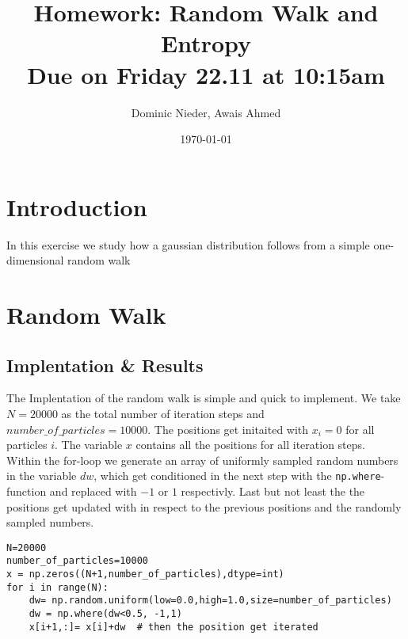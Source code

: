 \documentclass{article}[a4paper]
\title{
    \vspace{2in}
    \textmd{\textbf{Homework: Random Walk and Entropy}}\\
    \normalsize\vspace{0.1in}\small{Due on Friday 22.11 at 10:15am}\\
    \vspace{0.1in}
    \vspace{3in}
}
\author{Dominic Nieder, Awais Ahmed}
\date{\today}
\begin{document}
\section{Introduction}

In this exercise we study how a gaussian distribution follows from a simple one-dimensional random walk

\section{Random Walk}
\subsection{Implentation \& Results}

The Implentation of the random walk is simple and quick to implement. 
We take $N=20000$ as the total number of iteration steps and $number\_of\_particles=10000$. The positions get initaited with $x_i=0$ for all particles $i$. The variable $x$ contains all the positions for all iteration steps.\\
Within the for-loop we generate an array of uniformly sampled random numbers in the variable $dw$, which get conditioned in the next step with the \texttt{np.where}-function and replaced with $-1$ or $1$ respectivly. Last but not least the the positions get updated with in respect to the previous positions and the randomly sampled numbers.

\begin{lstlisting}
N=20000  
number_of_particles=10000  
x = np.zeros((N+1,number_of_particles),dtype=int) 
for i in range(N):
    dw= np.random.uniform(low=0.0,high=1.0,size=number_of_particles)  
    dw = np.where(dw<0.5, -1,1)  
    x[i+1,:]= x[i]+dw  # then the position get iterated
\end{lstlisting}
\end{document}
